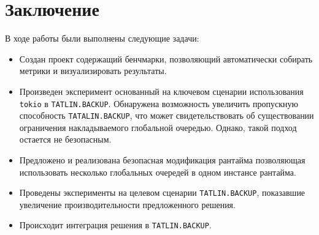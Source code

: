 
\section{Заключение}

В ходе работы были выполнены следующие задачи:

\begin{itemize}
    \item Создан проект содержащий бенчмарки, позволяющий автоматически собирать метрики и визуализировать результаты.
    \item Произведен эксперимент основанный на ключевом сценарии использования \verb|tokio| в \verb|TATLIN.BACKUP|. Обнаружена возможность увеличить пропускную способность \verb|TATALIN.BACKUP|, что может свидетельствовать об существовании ограничения накладываемого глобальной очередью. Однако, такой подход остается не безопасным.
    \item Предложено и реализована безопасная модификация рантайма позволяющая использовать несколько глобальных очередей в одном инстансе рантайма.
    \item Проведены эксперименты на целевом сценарии \verb|TATLIN.BACKUP|, показавшие увеличение производительности предложенного решения.
    \item Происходит интеграция решения в \verb|TATLIN.BACKUP|.
\end{itemize}
